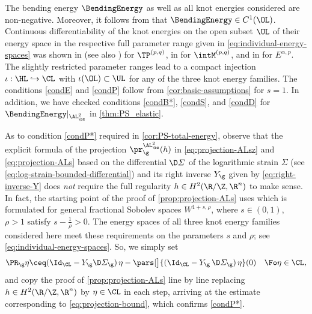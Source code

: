 \begin{refproof}
The bending energy $\BendingEnergy$
as well as all knot energies considered are non-negative. Moreover, it follows from
\cite[Proposition 4.8]{okabe-schrader_2023} that $\BendingEnergy\in C^1(\OL)$. 
Continuous
differentiability of the knot energies on the open subset $\UL$ of their 
energy space in the respective full parameter range given in \cref{eq:individual-energy-spaces} was shown in \cite[Theorem 1.4 \& subsequent remark]{blatt-reiter_2015a}
(see also \cite{wings_2018}) for $\TP^{(p,q)}$, in 
\cite[Theorem 3]{blatt-reiter_2015b}
for $\intM^{(p,q)}$, and in \cite[Theorem 5.1]{matt-etal_2023}
for $E^{\alpha,p}$. The slightly
restricted parameter ranges 
lead to a compact injection $\iota:\HL\hookrightarrow \CL$ with $\iota(\OL)\subset
\UL$ for any of the three knot energy families.
The conditions \ref{condE} and \ref{condP} follow from \cref{cor:basic-assumptions} for $s=1$. 
In addition, we have checked conditions \ref{condB*}, \ref{condS}, and \ref{condD} for $\BendingEnergy|_{\AL^2_\bz}$
in \cref{thm:PS_elastic}. 

As to condition \ref{condP*} required in \cref{cor:PS-total-energy},
observe that the explicit formula of the projection $\pr_\g^{\AL^2_\bz}(h)$
in \cref{eq:projection-ALsz} and \cref{eq:projection-ALs} based on the differential
$\D \varSigma $ of the logarithmic strain $\varSigma$ (see \cref{eq:log-strain-bounded-differential}) and its right
inverse $Y_\g$ given by \cref{eq:right-inverse-Y} does \emph{not} require the full regularity
$h\in H^2(\R/\Z,\R^n)$ to make sense. 
In fact, the starting point of the proof of \cref{prop:projection-ALs} uses \cite[Lemma 5.2]{knappmann-etal_2023} which is 
formulated for general fractional Sobolev spaces $W^{1+s,\rho}$, where $s\in (0,1),$
$\rho>1$ satisfy $s-\frac1{\rho} >0$. The energy spaces of all three knot energy families considered
here meet these requirements on the parameters $s$ and $\rho$; see \cref{eq:individual-energy-spaces}. So, we simply set 
$$
        \PR_\g \eta
        \ceq
        (\Id_\CL-Y_\g  \D \varSigma_\g) \, \eta - \pars[\big]{(\Id_\CL-Y_\g \, \D \varSigma_\g) \, \eta}(0)
        \quad\Fo\eta\in\CL,
$$
and copy the proof of \cref{prop:projection-ALs} line by line replacing
$h\in H^2(\R/\Z,\R^n)$ by $\eta\in\CL$ in each step, arriving at the estimate
corresponding to \cref{eq:projection-bound}, which confirms \ref{condP*}.



\end{refproof}
